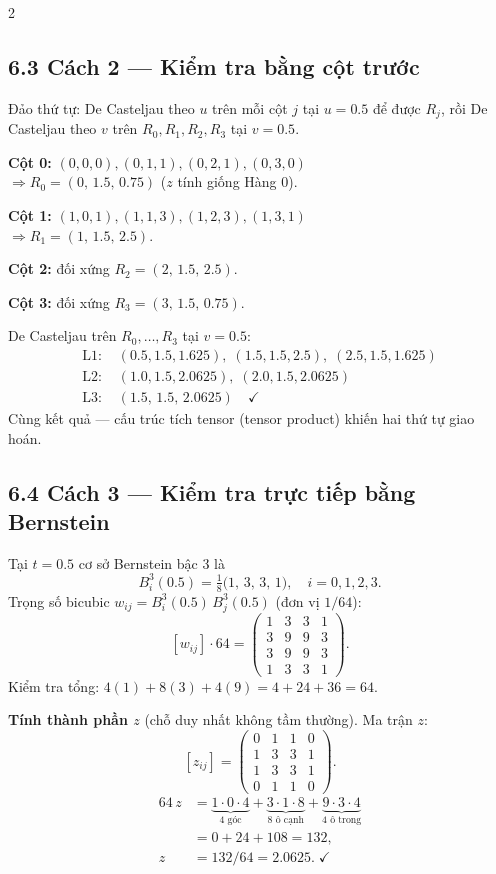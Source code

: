 \begin{paracol}{2}
\subsection*{6.3 Cách 2 --- Kiểm tra bằng cột trước}

Đảo thứ tự: De Casteljau theo $u$ trên mỗi cột $j$ tại $u=0.5$ để được $R_j$, rồi De Casteljau theo $v$ trên $R_0,R_1,R_2,R_3$ tại $v=0.5$.

\textbf{Cột 0:} $(0,0,0),(0,1,1),(0,2,1),(0,3,0)$\\
$\Rightarrow R_0=(0,\,1.5,\,0.75)$ ($z$ tính giống Hàng 0).

\textbf{Cột 1:} $(1,0,1),(1,1,3),(1,2,3),(1,3,1)$\\
$\Rightarrow R_1=(1,\,1.5,\,2.5)$.

\textbf{Cột 2:} đối xứng $R_2=(2,\,1.5,\,2.5)$.

\textbf{Cột 3:} đối xứng $R_3=(3,\,1.5,\,0.75)$.

De Casteljau trên $R_0,\dots,R_3$ tại $v=0.5$:
\begin{align*}
\text{L1: }& (0.5,1.5,1.625),\;(1.5,1.5,2.5),\;(2.5,1.5,1.625)\\
\text{L2: }& (1.0,1.5,2.0625),\;(2.0,1.5,2.0625)\\
\text{L3: }& (1.5,\,1.5,\,2.0625)\quad\checkmark
\end{align*}
Cùng kết quả --- cấu trúc tích tensor (tensor product) khiến hai thứ tự giao hoán.

\subsection*{6.4 Cách 3 --- Kiểm tra trực tiếp bằng Bernstein}

Tại $t=0.5$ cơ sở Bernstein bậc 3 là
\[
B_i^3(0.5)=\tfrac{1}{8}\big(1,\,3,\,3,\,1\big),\quad i=0,1,2,3.
\]
Trọng số bicubic $w_{ij}=B_i^3(0.5)\,B_j^3(0.5)$ (đơn vị $1/64$):
\[
[w_{ij}]\cdot 64=
\begin{pmatrix}
1 & 3 & 3 & 1\\
3 & 9 & 9 & 3\\
3 & 9 & 9 & 3\\
1 & 3 & 3 & 1
\end{pmatrix}.
\]
Kiểm tra tổng: $4(1)+8(3)+4(9)=4{+}24{+}36=64$. \checkmark

\textbf{Tính thành phần $z$} (chỗ duy nhất không tầm thường). Ma trận $z$:
\[
[z_{ij}]=\begin{pmatrix}0&1&1&0\\1&3&3&1\\1&3&3&1\\0&1&1&0\end{pmatrix}.
\]
\begin{align*}
64\,z &= \underbrace{1\!\cdot\!0\!\cdot\!4}_{\text{4 góc}} + \underbrace{3\!\cdot\!1\!\cdot\!8}_{\text{8 ô cạnh}} + \underbrace{9\!\cdot\!3\!\cdot\!4}_{\text{4 ô trong}}\\
&= 0 + 24 + 108 = 132,\\
z &= 132/64 = 2.0625.\;\checkmark
\end{align*}


\end{paracol}
